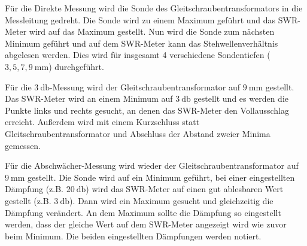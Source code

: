 Für die Direkte Messung wird die Sonde des Gleitschraubentransformators in die Messleitung gedreht.
Die Sonde wird zu einem Maximum geführt und das SWR-Meter wird auf das Maximum gestellt.
Nun wird die Sonde zum nächsten Minimum geführt und auf dem SWR-Meter kann das Stehwellenverhältnis abgelesen werden.
Dies wird für insgesamt 4 verschiedene Sondentiefen ($3,5,7,\SI{9}{\milli\meter}$) durchgeführt.

Für die $\SI{3}{\decibel}$-Messung wird der Gleitschraubentransformator auf $\SI{9}{\milli\meter}$ gestellt.
Das SWR-Meter wird an einem Minimum auf $\SI{3}{\decibel}$ gestellt
und es werden die Punkte links und rechts gesucht, an denen das SWR-Meter den Vollausschlag erreicht.
Außerdem wird mit einem Kurzschluss statt Gleitschraubentransformator und Abschluss der Abstand zweier Minima gemessen.

Für die Abschwächer-Messung wird wieder der Gleitschraubentransformator auf $\SI{9}{\milli\meter}$ gestellt.
Die Sonde wird auf ein Minimum geführt,
bei einer eingestellten Dämpfung (z.B. $\SI{20}{\decibel}$) wird das SWR-Meter auf einen gut ablesbaren Wert gestellt (z.B. $\SI{3}{\decibel}$). 
Dann wird ein Maximum gesucht und gleichzeitig die Dämpfung verändert. 
An dem Maximum sollte die Dämpfung so eingestellt werden, dass der gleiche Wert auf dem SWR-Meter angezeigt wird wie zuvor beim Minimum.
Die beiden eingestellten Dämpfungen werden notiert.